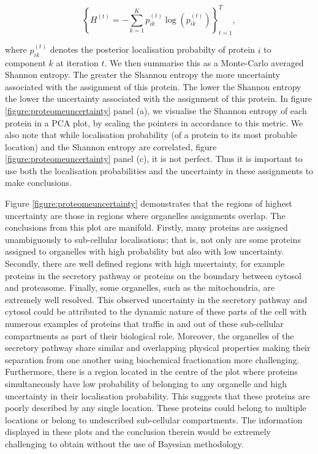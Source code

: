 \documentclass[10pt,letterpaper]{article}\usepackage[]{graphicx}\usepackage[]{color}
\begin{document}
\begin{equation}
\left\{H^{(t)} = - \sum_{k=1}^Kp^{(t)}_{ik} \log\left(p^{(t)}_{ik}\right)\right\}^{T}_{t=1},
\end{equation}

where $p^{(t)}_{ik}$ denotes the posterior localisation probabilty of
protein $i$ to component $k$ at iteration $t$. We then summarise this
as a Monte-Carlo averaged Shannon entropy.  The greater the Shannon
entropy the more uncertainty associated with the assignment of this
protein. The lower the Shannon entropy the lower the uncertainty
associated with the assignment of this protein.  In figure
\ref{figure:proteomeuncertainty} panel (a), we visualise the Shannon
entropy of each protein in a PCA plot, by scaling the pointers in
accordance to this metric. We also note that while localisation
probability (of a protein to its most probable location) and the
Shannon entropy are correlated, figure
\ref{figure:proteomeuncertainty} panel (c), it is not perfect. Thus it
is important to use both the localisation probabilities and the
uncertainty in these assignments to make conclusions.


Figure \ref{figure:proteomeuncertainty} demonstrates that the regions
of highest uncertainty are those in regions where organelles
assignments overlap. The conclusions from this plot are
manifold. Firstly, many proteins are assigned unambiguously to
sub-cellular localisations; that is, not only are some proteins
assigned to organelles with high probability but also with low
uncertainty. Secondly, there are well defined regions with high
uncertainty, for example proteins in the secretory pathway or proteins
on the boundary between cytosol and proteasome. Finally, some
organelles, such as the mitochondria, are extremely well
resolved. This observed uncertainty in the secretory pathway and
cytosol could be attributed to the dynamic nature of these parts of
the cell with numerous examples of proteins that traffic in and out of
these sub-cellular compartments as part of their biological
role. Moreover, the organelles of the secretory pathway share similar
and overlapping physical properties making their separation from one
another using biochemical fractionation more challenging.
Furthermore, there is a region located in the centre of the plot where
proteins simultaneously have low probability of belonging to any
organelle and high uncertainty in their localisation probability.
This suggests that these proteins are poorly described by any single
location. These proteins could belong to multiple locations or belong
to undescribed sub-cellular compartments. The information displayed in
these plots and the conclusion therein would be extremely challenging
to obtain without the use of Bayesian methodology.
\end{document}
